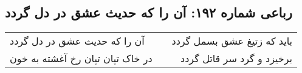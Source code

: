 \begin{center}
\section*{رباعی شماره ۱۹۲: آن را که حدیث عشق در دل گردد}
\label{sec:sh192}
\begin{longtable}{l p{0.5cm} r}
آن را که حدیث عشق در دل گردد
&&
باید که زتیغ عشق بسمل گردد
\\
در خاک تپان تپان رخ آغشته به خون
&&
برخیزد و گرد سر قاتل گردد
\\
\end{longtable}
\end{center}
